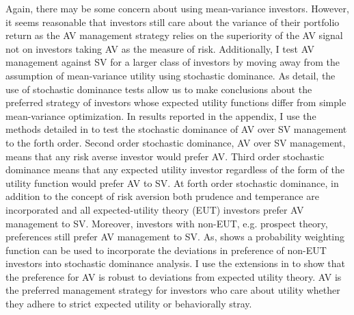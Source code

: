Again, there may be some concern about using mean-variance investors. However, it seems reasonable that investors still care about the variance of their portfolio return as the AV management strategy relies on the superiority of the AV signal not on investors taking AV as the measure of risk. Additionally, I test AV management against SV for a larger class of investors by moving away from the assumption of mean-variance utility using stochastic dominance. As \citet{hadar_rules_1969,hanoch_efficiency_1969,rothschild_increasing_1970,levy_experimental_2002} detail, the use of stochastic dominance tests allow us to make conclusions about the preferred strategy of investors whose expected utility functions differ from simple mean-variance optimization. In results reported in the appendix, I use the methods detailed in \citet{vinod_h.d._ranking_2004,vinod_hands-intermediate_2008} to test the stochastic dominance of AV over SV management to the forth order. Second order stochastic dominance, AV over SV management, means that any risk averse investor would prefer AV. \citep{mcfadden_testing_1989,valle_novel_2017} Third order stochastic dominance means that any expected utility investor regardless of the form of the utility function would prefer AV to SV. \citep{whitmore_third-degree_1970,chan_third_2016} At forth order stochastic dominance, in addition to the concept of risk aversion both prudence and temperance are incorporated and all expected-utility theory (EUT) investors prefer AV management to SV. \citep{kimball_standard_1993,noauthor_risk-aversion_nodate} Moreover, investors with non-EUT, e.g. prospect theory, preferences still prefer AV management to SV. \citep{kahneman_prospect_1979} As, \citet{prelec_probability_1998} shows a probability weighting function can be used to incorporate the deviations in preference of non-EUT investors into stochastic dominance analysis.  I use the extensions in \citet{vinod_generalized_2016} to show that the preference for AV is robust to deviations from expected utility theory. AV is the preferred management strategy for investors who care about utility whether they adhere to strict expected utility or behaviorally stray.

